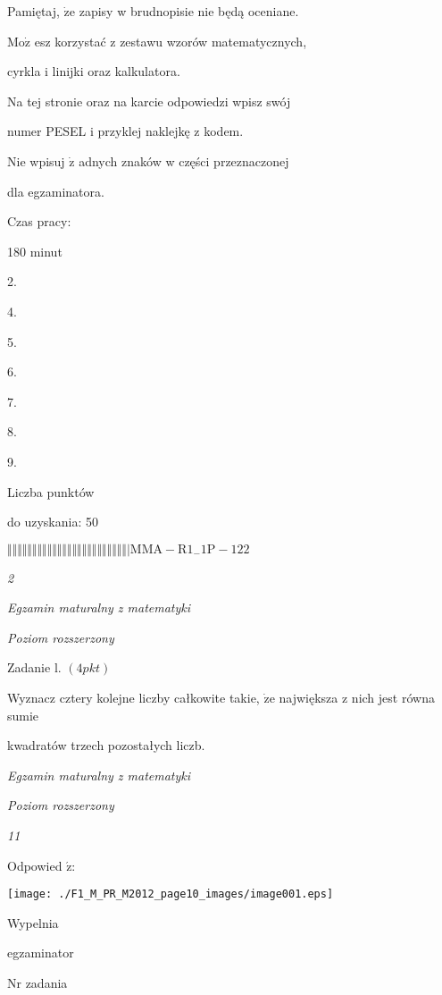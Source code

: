 \documentclass[a4paper,12pt]{article}
\begin{document}
Pamiętaj, $\dot{\mathrm{z}}\mathrm{e}$ zapisy w brudnopisie nie będą oceniane.

$\mathrm{M}\mathrm{o}\dot{\mathrm{z}}$ esz korzystać z zestawu wzorów matematycznych,

cyrkla i linijki oraz kalkulatora.

Na tej stronie oraz na karcie odpowiedzi wpisz swój

numer PESEL i przyklej naklejkę z kodem.

Nie wpisuj $\dot{\mathrm{z}}$ adnych znaków w części przeznaczonej

dla egzaminatora.

Czas pracy:

180 minut

2.

4.

5.

6.

7.

8.

9.

Liczba punktów

do uzyskania: 50

$\Vert\Vert\Vert\Vert\Vert\Vert\Vert\Vert\Vert\Vert\Vert\Vert\Vert\Vert\Vert\Vert\Vert\Vert\Vert\Vert\Vert\Vert\Vert\Vert|  \mathrm{M}\mathrm{M}\mathrm{A}-\mathrm{R}1_{-}1\mathrm{P}-122$




{\it 2}

{\it Egzamin maturalny z matematyki}

{\it Poziom rozszerzony}

Zadanie l. $(4pkt)$

Wyznacz cztery kolejne liczby całkowite takie, $\dot{\mathrm{z}}\mathrm{e}$ największa z nich jest równa sumie

kwadratów trzech pozostałych liczb.





{\it Egzamin maturalny z matematyki}

{\it Poziom rozszerzony}

{\it 11}

Odpowied $\acute{\mathrm{z}}$:
\begin{center}
\texttt{[image: ./F1\_M\_PR\_M2012\_page10\_images/image001.eps]}
\end{center}
Wypelnia

egzaminator

Nr zadania
\end{document}
